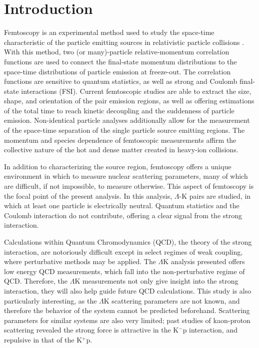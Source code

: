 \documentclass[ALICE,manyauthors]{cernphprep}
\newcommand{\Lam}{$\Lambda$\xspace}
\newcommand{\LamK}{$\Lambda$K\xspace}
\begin{document}
\setcounter{page}{2}

\section{Introduction}
\label{sec:Introduction}

Femtoscopy is an experimental method used to study the space-time characteristic of the particle emitting sources in relativistic particle collisions \cite{Lisa:2005dd}.  
With this method, two (or many)-particle relative-momentum correlation functions are used to connect the final-state momentum distributions to the space-time distributions of particle emission at freeze-out.  
The correlation functions are sensitive to quantum statistics, as well as strong and Coulomb final-state interactions (FSI).  
Current femtoscopic studies are able to extract the size, shape, and orientation of the pair emission regions, as well as offering estimations of the total time to reach kinetic decoupling and the suddenness of particle emission.
Non-identical particle analyses additionally allow for the measurement of the space-time separation of the single particle source emitting regions.
The momentum and species dependence of femtoscopic measurements affirm the collective nature of the hot and dense matter created in heavy-ion collisions.

In addition to characterizing the source region, femtoscopy offers a unique environment in which to measure nuclear scattering parameters, many of which are difficult, if not impossible, to measure otherwise.  
This aspect of femtoscopy is the focal point of the present analysis. 
In this analysis, \Lam-K pairs are studied, in which at least one particle is electrically neutral.  
Quantum statistics and the Coulomb interaction do not contribute, offering a clear signal from the strong interaction.

Calculations within Quantum Chromodynamics (QCD), the theory of the strong interaction, are notoriously difficult except in select regimes of weak coupling, where perturbative methods may be applied. 
The \LamK analysis presented offers low energy QCD measurements, which fall into the non-perturbative regime of QCD.
Therefore, the \LamK measurements not only give insight into the strong interaction, they will also help guide future QCD calculations.
This study is also particularly interesting, as the \LamK scattering parameters are not known, and therefore the behavior of the system cannot be predicted beforehand.
Scattering parameters for similar systems are also very limited; past studies of kaon-proton scattering revealed the strong force is attractive in the K$^{-}$p interaction, and repulsive in that of the K$^{+}$p.
\end{document}
